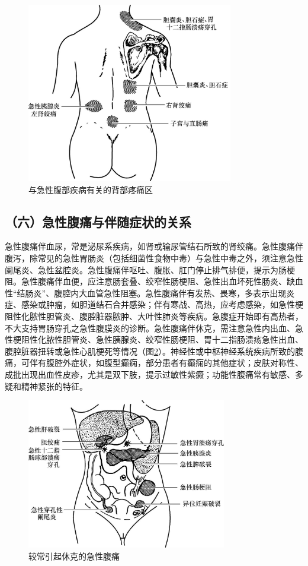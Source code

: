 \begin{figure}[!htbp]
 \centering
 \includegraphics[width=3.55208in,height=3.09375in]{./images/Image00139.jpg}
 \captionsetup{justification=centering}
 \caption{与急性腹部疾病有关的背部疼痛区}
 \label{fig25-3}
  \end{figure} 

\subsection{（六）急性腹痛与伴随症状的关系}

急性腹痛伴血尿，常是泌尿系疾病，如肾或输尿管结石所致的肾绞痛。急性腹痛伴腹泻，除常见的急性胃肠炎（包括细菌性食物中毒）与急性中毒之外，须注意急性阑尾炎、急性盆腔炎。急性腹痛伴呕吐、腹胀、肛门停止排气排便，提示为肠梗阻。急性腹痛伴血便，应注意肠套叠、绞窄性肠梗阻、急性出血坏死性肠炎、缺血性“结肠炎”、腹腔内大血管急性阻塞。急性腹痛伴有发热、畏寒，多表示出现炎症、感染或肿瘤，如胆道结石合并感染；伴有寒战、高热，应考虑感染，如急性梗阻性化脓性胆管炎、腹腔脏器脓肿、大叶性肺炎等疾病。急腹症开始即有高热者，不大支持胃肠穿孔之急性腹膜炎的诊断。急性腹痛伴休克，需注意急性内出血、急性梗阻性化脓性胆管炎、急性胰腺炎、绞窄性肠梗阻、胃十二指肠溃疡急性出血、腹腔脏器扭转或急性心肌梗死等情况（图\ref{fig25-4}）。神经性或中枢神经系统疾病所致的腹痛，可伴有腹腔外症状，如腹型癫痫，部分患者有癫痫的其他症状；皮肤对称性、成批出现出血性皮疹，尤其是双下肢，提示过敏性紫癜；功能性腹痛常有敏感、多疑和精神紧张的特征。

\begin{figure}[!htbp]
 \centering
 \includegraphics[width=3.4375in,height=2.58333in]{./images/Image00140.jpg}
 \captionsetup{justification=centering}
 \caption{较常引起休克的急性腹痛}
 \label{fig25-4}
  \end{figure} 

